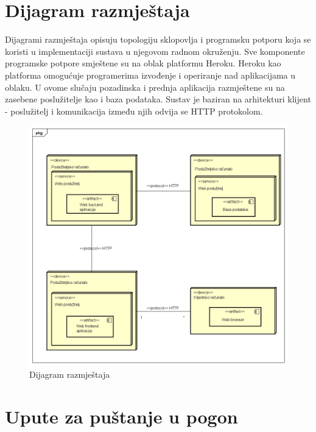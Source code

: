			\eject 
		
		
		\section{Dijagram razmještaja}
			 
			 Dijagrami razmještaja opisuju topologiju sklopovlja i programsku potporu koja se koristi u implementaciji sustava u njegovom radnom okruženju. Sve komponente programske potpore smještene su na oblak platformu Heroku. Heroku kao platforma omogućuje programerima izvođenje i operiranje nad aplikacijama u oblaku. U ovome slučaju pozadinska i prednja aplikacija razmještene su na zasebene poslužitelje kao i baza podataka. Sustav je baziran na arhitekturi klijent - poslužitelj i komunikacija između njih odvija se HTTP protokolom. 
			 
			 	\begin{figure}[H]
			 	\begin{center}
			 		\includegraphics[width=15cm]{slike/deploy_fin.PNG}
			 	\end{center}
			 	\caption{Dijagram razmještaja}
			 	\label{fig:deploy_pic}
			 \end{figure}
			
			\eject 
		
		\section{Upute za puštanje u pogon}
		
